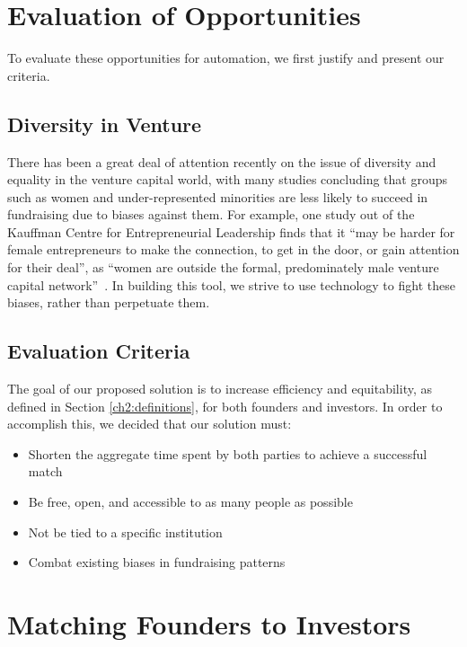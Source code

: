 \section{Evaluation of Opportunities}

To evaluate these opportunities for automation, we first justify and present our criteria.

\subsection{Diversity in Venture}

There has been a great deal of attention recently on the issue of diversity and equality in the venture capital world, with many studies concluding that groups such as women and under-represented minorities are less likely to succeed in fundraising due to biases against them. For example, one study out of the Kauffman Centre for Entrepreneurial Leadership finds that it ``may be harder for female entrepreneurs to make the connection, to get in the door, or gain attention for their deal'', as ``women are outside the formal, predominately male venture capital network''~\cite{doi:10.1080/13691060118175}. In building this tool, we strive to use technology to fight these biases, rather than perpetuate them.

\subsection{Evaluation Criteria}

The goal of our proposed solution is to increase efficiency and equitability, as defined in Section \ref{ch2:definitions}, for both founders and investors. In order to accomplish this, we decided that our solution must:

\begin{itemize}
  \item Shorten the aggregate time spent by both parties to achieve a successful match
  \item Be free, open, and accessible to as many people as possible
  \item Not be tied to a specific institution
  \item Combat existing biases in fundraising patterns
\end{itemize}

\section{Matching Founders to Investors}
\label{ch2:matching}


